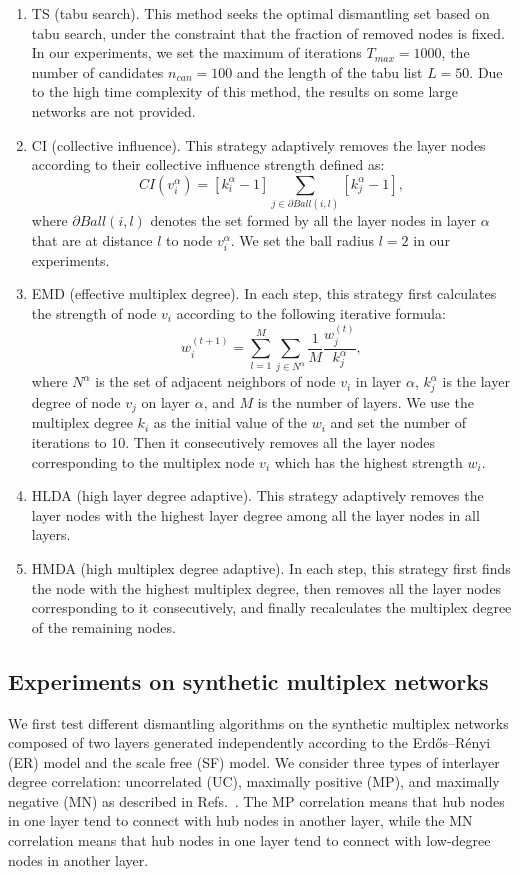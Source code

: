 \documentclass[%
 aip,
 cha,
 amsmath,amssymb,
 reprint,%
]{revtex4-1}
\begin{document}
\begin{enumerate}
    \item TS (tabu search)\cite{qi2018optimal}. This method seeks the optimal dismantling set based on tabu search, under the constraint that the fraction of removed nodes is fixed. In our experiments, we set the maximum of iterations $T_{max} = 1000$, the number of candidates $n_{can} = 100$ and the length of the tabu list $L = 50$. Due to the high time complexity of this method, the results on some large networks are not provided.
    \item CI (collective influence)\cite{Morone2015}. This strategy adaptively removes the layer nodes according to their collective influence strength defined as:
    $$CI(v_i^\alpha) = \left[k_i^\alpha -1\right]\sum_{j\in \partial Ball(i,l)}\left[k_j^\alpha -1\right],$$ where $\partial Ball(i,l)$ denotes the set formed by all the layer nodes in layer $\alpha$ that are at distance $l$ to node $v_i^\alpha$. We set the ball radius $l=2$ in our experiments.
    \item EMD (effective multiplex degree)\cite{PhysRevE.98.032307}. In each step, this strategy first calculates the strength of node $v_i$ according to the following iterative formula:
    $$w_i^{(t+1)}=\sum_{l=1}^M\sum_{j\in N^\alpha}\frac{1}{M}\frac{w_j^{(t)}}{k_j^\alpha},$$
    where $N^\alpha$ is the set of adjacent neighbors of node $v_i$ in layer $\alpha$, $k_j^\alpha$ is the layer degree of node $v_j$ on layer $\alpha$, and $M$ is the number of layers. We use the multiplex degree $k_i$ as the initial value of the $w_i$ and set the number of iterations to 10. Then it consecutively removes all the layer nodes corresponding to the multiplex node $v_i$ which has the highest strength $w_i$.
    \item HLDA (high layer degree adaptive)\cite{qi2018optimal}. This strategy adaptively removes the layer nodes with the highest layer degree among all the layer nodes in all layers.
    \item HMDA (high multiplex degree adaptive)\cite{qi2018optimal}. In each step, this strategy first finds the node with the highest multiplex degree, then removes all the layer nodes corresponding to it consecutively, and finally recalculates the multiplex degree of the remaining nodes.
\end{enumerate}
\subsection{Experiments on synthetic multiplex networks}
We first test different dismantling algorithms on the synthetic multiplex networks composed of two layers generated independently according to the Erdős–Rényi (ER) model and the scale free (SF) model. We consider three types of interlayer degree correlation: uncorrelated (UC), maximally positive (MP), and maximally negative (MN) as described in Refs.~. The MP correlation means that hub nodes in one layer tend to connect with hub nodes in another layer, while the MN correlation means that hub nodes in one layer tend to connect with low-degree nodes in another layer.
\end{document}
